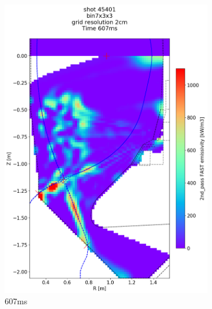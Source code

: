 \begin{figure}
\begin{subfigure}{0.395\linewidth}
         \includegraphics[trim={75 90 0 190},clip,width=\textwidth]{Chapters/chapter2/figs/IRVB-MASTU_shot-45401_export_86.png}
         \vspace*{-6.5mm}
         \caption{607ms}
         \label{fig:45401_export2_2}
     \end{subfigure}
     \begin{subfigure}{0.395\linewidth}
         \centering

\end{subfigure}
\end{figure}
